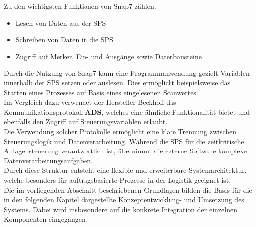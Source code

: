 Zu den wichtigsten Funktionen von Snap7 zählen:
\begin{itemize}
	\item Lesen von Daten aus der SPS
	\item Schreiben von Daten in die SPS
	\item Zugriff auf Merker, Ein- und Ausgänge sowie Datenbausteine
\end{itemize}

Durch die Nutzung von Snap7 kann eine Programmanwendung gezielt Variablen innerhalb der SPS setzen oder auslesen. Dies ermöglicht beispielsweise das Starten eines Prozesses auf Basis eines eingelesenen Scanwertes\cite{snap7}.\\

Im Vergleich dazu verwendet der Hersteller Beckhoff das Kommunikationsprotokoll \textbf{ADS}, welches eine ähnliche Funktionalität bietet und ebenfalls den Zugriff auf Steuerungsvariablen erlaubt.\\

Die Verwendung solcher Protokolle ermöglicht eine klare Trennung zwischen Steuerungslogik und Datenverarbeitung. Während die SPS für die zeitkritische Anlagensteuerung verantwortlich ist, übernimmt die externe Software komplexe Datenverarbeitungsaufgaben\cite{snap7}.\\

Durch diese Struktur entsteht eine flexible und erweiterbare Systemarchitektur, welche besonders für auftragsbasierte Prozesse in der Logistik geeignet ist.\\

Die im vorliegenden Abschnitt beschriebenen Grundlagen bilden die Basis für die in den folgenden Kapitel dargestellte Konzeptentwicklung- und Umsetzung des Systems. Dabei wird insbesondere auf die konkrete Integration der einzelnen Komponenten eingegangen.